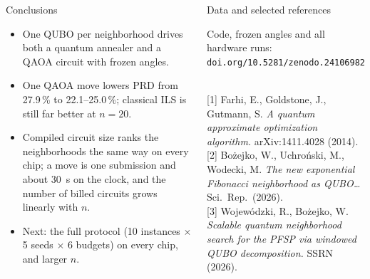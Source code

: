 \documentclass[final]{beamer}
\newlength{\colh}\setlength{\colh}{0.83\textheight}
\begin{document}
\begin{frame}
{\begin{columns}[T]
\begin{minipage}[t][\colh][s]{\linewidth}
\vfill

\begin{block}{Conclusions}
\vspace*{2mm}
\begin{itemize}
  \item One QUBO per neighborhood drives both a quantum annealer and a QAOA
    circuit with frozen angles.
  \item One QAOA move lowers PRD from 27.9\,\% to 22.1--25.0\,\%; classical
    ILS is still far better at $n=20$.
  \item Compiled circuit size ranks the neighborhoods the same way on every
    chip; a move is one submission and about 30~s on the clock, and the
    number of billed circuits grows linearly with $n$.
  \item Next: the full protocol (10 instances $\times$ 5 seeds $\times$
    6 budgets) on every chip, and larger $n$.
\end{itemize}
\vspace*{2mm}
\end{block}

\vfill

\begin{block}{Data and selected references}
\vspace*{1mm}
\begin{minipage}[c]{0.24\columnwidth}\end{minipage}\hfill
\begin{minipage}[c]{0.73\columnwidth}Code, frozen angles and all hardware runs:\\
{\small\texttt{doi.org/10.5281/zenodo.24106982}}\end{minipage}\\[1.2ex]
{\small
[1] Farhi, E., Goldstone, J., Gutmann, S. \emph{A quantum approximate
    optimization algorithm.} arXiv:1411.4028 (2014).\\[0.4ex]
[2] Bo\.zejko, W., Uchro\'nski, M., Wodecki, M. \emph{The new exponential
    Fibonacci neighborhood as QUBO\ldots} Sci.\ Rep.\ (2026).\\[0.4ex]
[3] Wojew\'odzki, R., Bo\.zejko, W. \emph{Scalable quantum neighborhood
    search for the PFSP via windowed QUBO decomposition.} SSRN (2026).
}
\vspace*{1mm}
\end{block}

\end{minipage}
\end{columns}
}
\end{frame}
\end{document}
